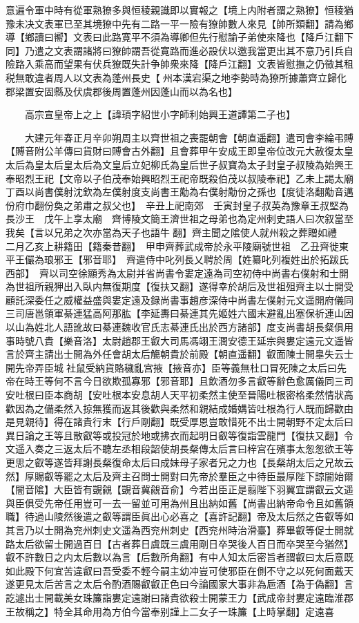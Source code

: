 意遍令軍中時有從軍熟獠多與恒稜親識即以實報之【境上内附者謂之熟獠】恒稜猶豫未决文表軍已至其境獠中先有二路一平一險有獠帥數人來見【帥所類翻】請為鄉導【鄉讀曰嚮】文表曰此路寛平不須為導卿但先行慰諭子弟使來降也【降戶江翻下同】乃遣之文表謂諸將曰獠帥謂吾從寛路而進必設伏以邀我當更出其不意乃引兵自險路入乘高而望果有伏兵獠既失計争帥衆來降【降戶江翻】文表皆慰撫之仍徵其租税無敢違者周人以文表為蓬州長史【州本漢宕渠之地李勢時為獠所據蕭齊立歸化郡梁置安固縣及伏虞郡後周置蓬州因蓬山而以為名也】

　　高宗宣皇帝上之上【諱頊字紹世小字師利始興王道譚第二子也】

　　大建元年春正月辛卯朔周主以齊世祖之喪罷朝會【朝直遥翻】遣司會李綸弔賻【賻音附公羊傳曰貨財曰賻會古外翻】且會葬甲午安成王即皇帝位改元大赦復太皇太后為皇太后皇太后為文皇后立妃柳氏為皇后世子叔寶為太子封皇子叔陵為始興王奉昭烈王祀【文帝以子伯茂奉始興昭烈王祀帝既殺伯茂以叔陵奉祀】乙未上謁太廟丁酉以尚書僕射沈欽為左僕射度支尚書王勱為右僕射勱份之孫也【度徒洛翻勱音邁份府巾翻份奐之弟肅之叔父也】　辛丑上祀南郊　壬寅封皇子叔英為豫章王叔堅為長沙王　戊午上享太廟　齊博陵文簡王濟世祖之母弟也為定州刺史語人曰次叙當至我矣【言以兄弟之次亦當為天子也語牛翻】齊主聞之隂使人就州殺之葬贈如禮　二月乙亥上耕籍田【籍秦昔翻】　甲申齊葬武成帝於永平陵廟號世祖　乙丑齊徙東平王儼為琅邪王【邪音耶】　齊遣侍中叱列長乂聘於周【姓纂叱列複姓出於拓跋氏西部】　齊以司空徐顯秀為太尉并省尚書令婁定遠為司空初侍中尚書右僕射和士開為世祖所親狎出入臥内無復期度【復扶又翻】遂得幸於胡后及世祖殂齊主以士開受顧託深委任之威權益盛與婁定遠及録尚書事趙彦深侍中尚書左僕射元文遥開府儀同三司唐邕領軍綦連猛高阿那肱【李延夀曰綦連其先姬姓六國末避亂出塞保祈連山因以山為姓北人語訛故曰綦連魏收官氏志綦連氏出於西方諸部】度支尚書胡長粲俱用事時號八貴【樂音洛】太尉趙郡王叡大司馬馮翊王潤安德王延宗與婁定遠元文遥皆言於齊主請出士開為外任會胡太后觴朝貴於前殿【朝直遥翻】叡面陳士開辠失云士開先帝弄臣城社鼠受納貨賂穢亂宫掖【掖音亦】臣等義無杜口冒死陳之太后曰先帝在時王等何不言今日欲欺孤寡邪【邪音耶】且飲酒勿多言叡等辭色愈厲儀同三司安吐根曰臣本商胡【安吐根本安息胡人天平初柔然主使至晉陽吐根密格柔然情狀高歡因為之備柔然入掠無獲而返其後歡與柔然和親結成婚媾皆吐根為行人既而歸歡由是見親待】得在諸貴行末【行戶剛翻】既受厚恩豈敢惜死不出士開朝野不定太后曰異日論之王等且散叡等或投冠於地或拂衣而起明日叡等復詣雲龍門【復扶又翻】令文遥入奏之三返太后不聽左丞相段韶使胡長粲傳太后言曰梓宫在殯事太怱怱欲王等更思之叡等遂皆拜謝長粲復命太后曰成妹母子家者兄之力也【長粲胡太后之兄故云然】厚賜叡等罷之太后及齊主召問士開對曰先帝於羣臣之中待臣最厚陛下諒闇始爾【闇音隂】大臣皆有覬覦【覬音冀覦音俞】今若出臣正是翦陛下羽翼宜謂叡云文遥與臣俱受先帝任用豈可一去一留並可用為州且出納如舊【尚書出納帝命令且如舊領職】待過山陵然後遣之叡等謂臣眞出心必喜之【喜許記翻】帝及太后然之告叡等如其言乃以士開為兖州刺史文遥為西兖州刺史【西兖州時治滑臺】葬畢叡等促士開就路太后欲留士開過百日【古者葬日虞既三虞用剛日卒哭後人百日而卒哭至今猶然】叡不許數日之内太后數以為言【后數所角翻】有中人知太后密旨者謂叡曰太后意既如此殿下何宜苦違叡曰吾受委不輕今嗣主幼冲豈可使邪臣在側不守之以死何面戴天遂更見太后苦言之太后令酌酒賜叡叡正色曰今論國家大事非為巵酒【為于偽翻】言訖遽出士開載美女珠簾詣婁定遠謝曰諸貴欲殺士開蒙王力【武成帝封婁定遠臨淮郡王故稱之】特全其命用為方伯今當奉别謹上二女子一珠簾【上時掌翻】定遠喜